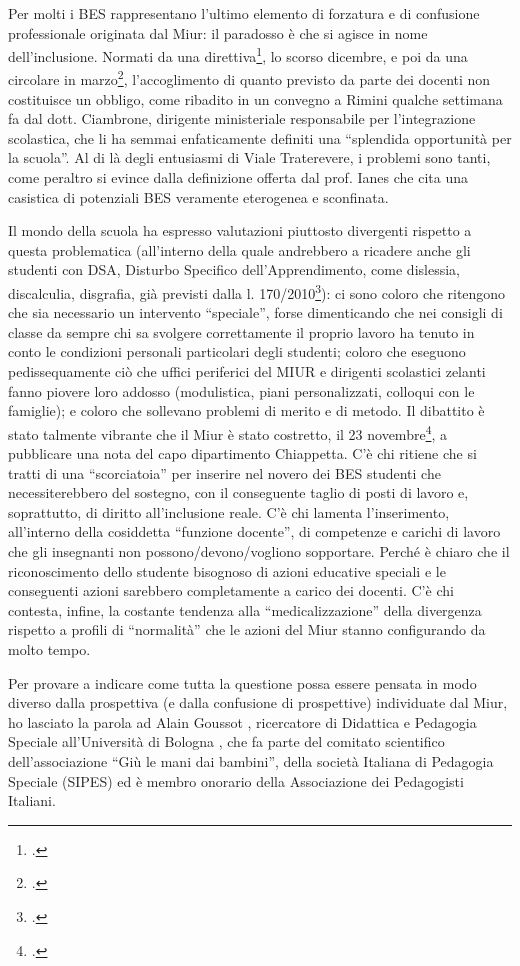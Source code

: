 Per molti i BES rappresentano l'ultimo elemento di forzatura e di confusione professionale originata dal Miur: il paradosso è che si agisce in nome dell'inclusione. Normati da una direttiva\footcite{dir27Dic2012}, lo scorso dicembre, e poi da una circolare in marzo\footcite{cm8_2013}, l'accoglimento di quanto previsto da parte dei docenti non costituisce un obbligo, come ribadito in un convegno a Rimini qualche settimana fa dal dott. Ciambrone, dirigente ministeriale responsabile per l'integrazione scolastica, che li ha semmai enfaticamente definiti una “splendida opportunità per la scuola”. Al di là degli entusiasmi di Viale Traterevere, i problemi sono tanti, come peraltro si evince dalla definizione offerta dal prof. Ianes che cita una casistica di potenziali BES veramente eterogenea e sconfinata.

Il mondo della scuola ha espresso valutazioni piuttosto divergenti rispetto a questa problematica (all'interno della quale andrebbero a ricadere anche gli studenti con DSA, Disturbo Specifico dell'Apprendimento, come dislessia, discalculia, disgrafia, già previsti dalla l. 170/2010\footcite{legge170}): ci sono coloro che ritengono che sia necessario un intervento “speciale”, forse dimenticando che nei consigli di classe da sempre chi sa svolgere correttamente il proprio lavoro ha tenuto in conto le condizioni personali particolari degli studenti; coloro che eseguono pedissequamente ciò che uffici periferici del MIUR e dirigenti scolastici zelanti fanno piovere loro addosso (modulistica, piani personalizzati, colloqui con le famiglie); e coloro che sollevano problemi di merito e di metodo. Il dibattito è stato talmente vibrante che il Miur è stato costretto, il 23 novembre\footcite{Nota_2563_2013}, a pubblicare una nota del capo dipartimento Chiappetta. C'è chi ritiene che si tratti di una “scorciatoia” per inserire nel novero dei BES studenti che necessiterebbero del sostegno, con il conseguente taglio di posti di lavoro e, soprattutto, di diritto all'inclusione reale. C'è chi lamenta l'inserimento, all'interno della cosiddetta “funzione docente”, di competenze e carichi di lavoro che gli insegnanti non possono/devono/vogliono sopportare. Perché è chiaro che il riconoscimento dello studente bisognoso di azioni educative speciali e le conseguenti azioni sarebbero completamente a carico dei docenti. C'è chi contesta, infine, la costante tendenza alla “medicalizzazione” della divergenza rispetto a profili di “normalità” che le azioni del Miur stanno configurando da molto tempo.

Per provare a indicare come tutta la questione possa essere pensata in modo diverso dalla prospettiva (e dalla confusione di prospettive) individuate dal Miur, ho lasciato la parola ad Alain Goussot , ricercatore di Didattica e Pedagogia Speciale all'Università di Bologna , che fa parte del comitato scientifico dell'associazione “Giù le mani dai bambini”, della società Italiana di Pedagogia Speciale (SIPES) ed è membro onorario della Associazione dei Pedagogisti Italiani.
